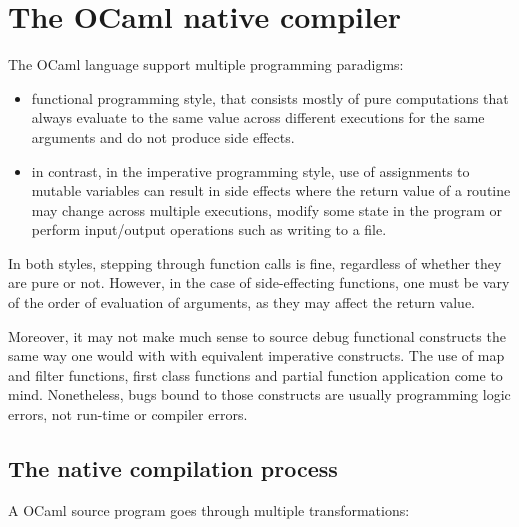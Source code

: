 \chapter{The OCaml native compiler\label{cha:chapter3}}

The OCaml language support multiple programming paradigms:
\begin{itemize}
    \item functional programming style, that consists mostly of pure computations that always
        evaluate to the same value across different executions for the same arguments
        and do not produce side effects.
    \item in contrast, in the imperative programming style,
        use of assignments to mutable variables can result in side effects
        where the return value of a routine may change across multiple executions,
        modify some state in the program or perform input/output operations
        such as writing to a file.
\end{itemize}

In both styles, stepping through function calls is fine, regardless of whether
they are pure or not.
However, in the case of side-effecting functions, one must be vary of the order of
evaluation of arguments, as they may affect the return value.

\vspace{5mm}

Moreover, it may not make much sense to source debug functional constructs
the same way one would with with equivalent imperative constructs.
The use of map and filter functions, first class functions and
partial function application come to mind.
Nonetheless, bugs bound to those constructs are usually programming
logic errors, not run-time or compiler errors.

\section{The native compilation process}

A OCaml source program goes through multiple transformations:

